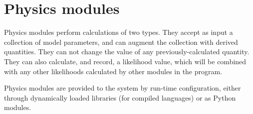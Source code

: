 \documentclass[draftmode,draftwater]{memarticle}
\begin{document}


\section{Physics modules}

Physics modules perform calculations of two types. They accept as
input a collection of model parameters, and can augment the collection
with derived quantities. They can not change the value of any 
previously-calculated quantity. They can also calculate, and record, a likelihood value,
which will be combined with any other likelihoods calculated by other
modules in the program.

Physics modules are provided to the system by run-time configuration,
either through dynamically loaded libraries (for compiled languages)
or as Python modules.
\end{document}
